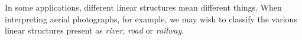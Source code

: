 In some applications, different linear structures mean different things. When interpreting aerial photographs, for example, we may wish to classify the various linear structures present as \emph{river}, \emph{road} or \emph{railway}.

